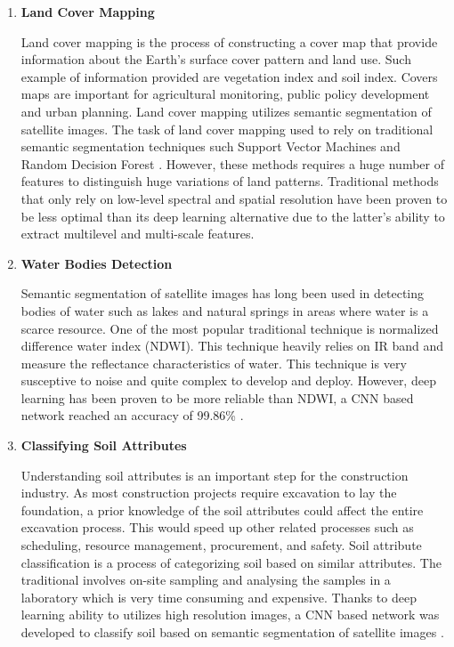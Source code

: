 \begin{enumerate}
    \item \textbf{Land Cover Mapping}
    
    Land cover mapping is the process of constructing a cover map that provide information about the Earth's surface cover pattern and land use. Such example of information provided are vegetation index and soil index. Covers maps are important for agricultural monitoring, public policy development and urban planning. Land cover mapping utilizes semantic segmentation of satellite images. The task of land cover mapping used to rely on traditional semantic segmentation techniques such Support Vector Machines and Random Decision Forest \cite{DBLP:journals/corr/Thoma16a}. However, these methods requires a huge number of features to distinguish huge variations of land patterns. Traditional methods that only rely on low-level spectral and spatial resolution have been proven to be less optimal than its  deep learning alternative due to the latter's ability to extract multilevel and multi-scale features\cite{Yuan2020DeepLI}. 
    
    \item \textbf{Water Bodies Detection}

    Semantic segmentation of satellite images has long been used in detecting bodies of water such as lakes and natural springs in areas where water is a scarce resource. One of the most popular traditional technique is normalized difference water index (NDWI). This technique heavily relies on IR band and measure the reflectance characteristics of water. This technique is very susceptive to noise and quite complex to develop and deploy. However, deep learning has been proven to be more reliable than NDWI, a CNN based network reached an accuracy of 99.86\% \cite{edseee.864274320181101}.
    
    \item \textbf{Classifying Soil Attributes}
    
    Understanding soil attributes is an important step for the construction industry. As most construction projects require excavation to lay the foundation, a prior knowledge of the soil attributes could affect the entire excavation process. This would speed up other related processes such as scheduling, resource management, procurement, and safety. Soil attribute classification is a process of categorizing soil based on similar attributes. The traditional involves on-site sampling and analysing the samples in a laboratory which is very time consuming and expensive. Thanks to deep learning ability to utilizes high resolution images, a CNN based network was developed to classify soil based on semantic segmentation of satellite images \cite{9554290}. 
    

\end{enumerate}
